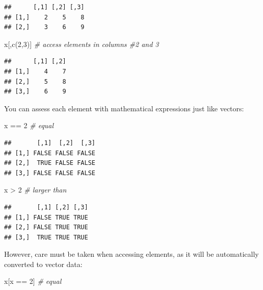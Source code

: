 \documentclass[
]{article}
\newenvironment{Shaded}{\begin{snugshade}}{\end{snugshade}}
\newcommand{\CommentTok}[1]{\textcolor[rgb]{0.56,0.35,0.01}{\textit{#1}}}
\newcommand{\DecValTok}[1]{\textcolor[rgb]{0.00,0.00,0.81}{#1}}
\newcommand{\FunctionTok}[1]{\textcolor[rgb]{0.00,0.00,0.00}{#1}}
\newcommand{\NormalTok}[1]{#1}
\newcommand{\SpecialCharTok}[1]{\textcolor[rgb]{0.00,0.00,0.00}{#1}}
\begin{document}
\begin{verbatim}
##      [,1] [,2] [,3]
## [1,]    2    5    8
## [2,]    3    6    9
\end{verbatim}

\begin{Shaded}
\begin{Highlighting}[]
\NormalTok{x[,}\FunctionTok{c}\NormalTok{(}\DecValTok{2}\NormalTok{,}\DecValTok{3}\NormalTok{)] }\CommentTok{\# access elements in columns \#2 and 3}
\end{Highlighting}
\end{Shaded}

\begin{verbatim}
##      [,1] [,2]
## [1,]    4    7
## [2,]    5    8
## [3,]    6    9
\end{verbatim}

You can assess each element with mathematical expressions just like vectors:

\begin{Shaded}
\begin{Highlighting}[]
\NormalTok{x }\SpecialCharTok{==} \DecValTok{2} \CommentTok{\# equal}
\end{Highlighting}
\end{Shaded}

\begin{verbatim}
##       [,1]  [,2]  [,3]
## [1,] FALSE FALSE FALSE
## [2,]  TRUE FALSE FALSE
## [3,] FALSE FALSE FALSE
\end{verbatim}

\begin{Shaded}
\begin{Highlighting}[]
\NormalTok{x }\SpecialCharTok{\textgreater{}} \DecValTok{2} \CommentTok{\# larger than}
\end{Highlighting}
\end{Shaded}

\begin{verbatim}
##       [,1] [,2] [,3]
## [1,] FALSE TRUE TRUE
## [2,] FALSE TRUE TRUE
## [3,]  TRUE TRUE TRUE
\end{verbatim}

However, care must be taken when accessing elements, as it will be automatically converted to vector data:

\begin{Shaded}
\begin{Highlighting}[]
\NormalTok{x[x }\SpecialCharTok{==} \DecValTok{2}\NormalTok{] }\CommentTok{\# equal}
\end{Highlighting}
\end{Shaded}
\end{document}
